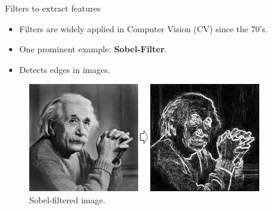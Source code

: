 





\begin{vbframe}{Filters to extract features}
    \begin{itemize}
        \item Filters are widely applied in Computer Vision (CV) since the 70's.
        \item One prominent example: \textbf{Sobel-Filter}.
        \item Detects edges in images.
    \end{itemize}
    \begin{figure}
        \centering
        \includegraphics[width=10cm]{figure/sobel_einstein.png}
        \caption{Sobel-filtered image.}
    \end{figure}
\framebreak


\end{vbframe}
